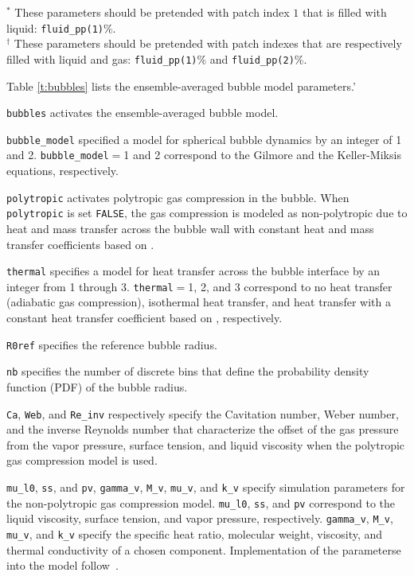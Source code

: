 \documentclass[11pt]{article}
\begin{document}
\begin{center}
\footnotesize{
$^*$ These parameters should be pretended with patch index $1$ that is filled with liquid: \texttt{fluid_pp(1)}\%.\\
$^\dagger$ These parameters should be pretended with patch indexes that are respectively filled with liquid and gas: \texttt{fluid_pp(1)}\% and \texttt{fluid_pp(2)}\%.
}
\end{center}

Table \ref{t:bubbles} lists the ensemble-averaged bubble model parameters.'

\texttt{bubbles} activates the ensemble-averaged bubble model.

\texttt{bubble\_model} specified a model for spherical bubble dynamics by an integer of 1 and 2.
\texttt{bubble\_model}$=$1 and 2 correspond to the Gilmore and the Keller-Miksis equations, respectively.

\texttt{polytropic} activates polytropic gas compression in the bubble.
When \texttt{polytropic} is set \texttt{FALSE}, the gas compression is modeled as non-polytropic due to heat and mass transfer across the bubble wall with constant heat and mass transfer coefficients based on \citep{Preston07}.

\texttt{thermal} specifies a model for heat transfer across the bubble interface by an integer from 1 through 3.
\texttt{thermal}$=$1, 2, and 3 correspond to no heat transfer (adiabatic gas compression), isothermal heat transfer, and heat transfer with a constant heat transfer coefficient based on \citet{Preston07}, respectively.

\texttt{R0ref} specifies the reference bubble radius.

\texttt{nb} specifies the number of discrete bins that define the probability density function (PDF) of the bubble radius.

\texttt{Ca}, \texttt{Web}, and \texttt{Re\_inv} respectively specify the Cavitation number, Weber number, and the inverse Reynolds number that characterize the offset of the gas pressure from the vapor pressure, surface tension, and liquid viscosity when the polytropic gas compression model is used.

\texttt{mu\_l0}, \texttt{ss}, and \texttt{pv}, \texttt{gamma\_v}, \texttt{M\_v}, \texttt{mu\_v}, and \texttt{k\_v} specify simulation parameters for the non-polytropic gas compression model.
\texttt{mu\_l0}, \texttt{ss}, and \texttt{pv} correspond to the liquid viscosity, surface tension, and vapor pressure, respectively. 
\texttt{gamma\_v}, \texttt{M\_v}, \texttt{mu\_v}, and \texttt{k\_v} specify the specific heat ratio, molecular weight, viscosity, and thermal conductivity of a chosen component.
Implementation of the parameterse into the model follow~\citet{Ando10}.
\end{document}
